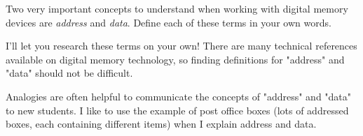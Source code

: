 

Two very important concepts to understand when working with digital memory devices are {\it address} and {\it data}.  Define each of these terms in your own words.







I'll let you research these terms on your own!  There are many technical references available on digital memory technology, so finding definitions for "address" and "data" should not be difficult.







Analogies are often helpful to communicate the concepts of "address" and "data" to new students.  I like to use the example of post office boxes (lots of addressed boxes, each containing different items) when I explain address and data.




